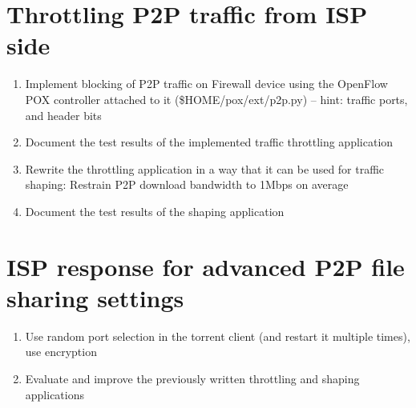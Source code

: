 \documentclass[a4paper]{article}
\begin{document}
\section{Throttling P2P traffic from ISP side}
\begin{enumerate}
	\item Implement blocking of P2P traffic on Firewall device using the OpenFlow POX controller attached to it (\$HOME/pox/ext/p2p.py) -- hint: traffic ports, and header bits
	\item Document the test results of the implemented traffic throttling application
	\item Rewrite the throttling application in a way that it can be used for traffic shaping: Restrain P2P download bandwidth to 1Mbps on average
	\item Document the test results of the shaping application
\end{enumerate}

\section{ISP response for advanced P2P file sharing settings}

\begin{enumerate}
	\item Use random port selection in the torrent client (and restart it multiple times), use encryption
	\item Evaluate and improve the previously written throttling and shaping applications
\end{enumerate}
\end{document}
